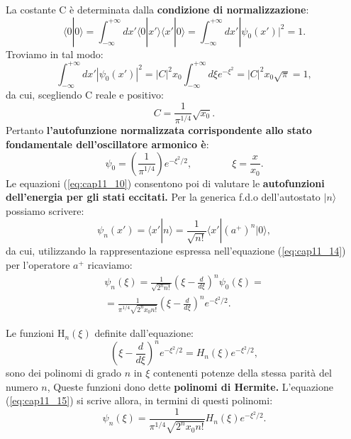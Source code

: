 \documentclass[a4paper,12pt,oneside]{book}
\begin{document}
La costante C è determinata dalla \textbf{condizione di normalizzazione}:
\begin{equation}
\langle 0|0 \rangle=\int_{-\infty}^{+\infty} dx' \langle 0|x'\rangle\langle x'|0 \rangle=\int_{-\infty}^{+\infty} dx' |\psi_0(x')|^2=1.
\end{equation}
Troviamo in tal modo:
\begin{equation}
\int_{-\infty}^{+\infty} dx' |\psi_0(x')|^2=|C|^2x_0\int_{-\infty}^{+\infty} d\xi e^{-\xi^2}=|C|^2 x_0 \sqrt{\pi}=1,
\end{equation}
da cui, scegliendo C reale e positivo:
\begin{equation}
C=\frac{1}{\pi^{{1}/{4}}} \sqrt{x_0}.
\end{equation}
Pertanto \textbf{l'autofunzione normalizzata corrispondente allo stato fondamentale dell'oscillatore armonico è}:
\begin{equation}
\psi_0=\left( \frac{1}{\pi^{{1}/{4}}}  \right) e^{-\xi^2/2}, \qquad \qquad \xi=\frac{x}{x_0}.
\end{equation}
 Le equazioni (\ref{eq:cap11_10}) consentono poi di valutare le \textbf{autofunzioni dell'energia per gli stati eccitati.} Per la generica f.d.o dell'autostato $|n\rangle$ possiamo scrivere:
\begin{equation}
\psi_n(x')=\langle x'|n \rangle=\frac{1}{\sqrt{n!}}\langle x'|(a^+)^n|0 \rangle,
\end{equation}
da cui, utilizzando la rappresentazione espressa nell'equazione (\ref{eq:cap11_14}) per l'operatore $a^+$ ricaviamo:
\begin{equation} \label{eq:cap11_15}
\begin{split}
	\psi_n(\xi)=\frac{1}{\sqrt{2^nn!}}(\xi-\frac{d}{d\xi})^n \psi_0({\xi})=\\
	=\frac{1}{\pi^{1/4}\sqrt{2^nx_0n!}}(\xi-\frac{d}{d\xi})^n e^{-\xi^2/2}.
\end{split} \end{equation}

 Le funzioni H$_n({\xi})$ definite dall'equazione:
\begin{equation}
(\xi-\frac{d}{d\xi})^n e^{-\xi^2/2}=H_n(\xi)e^{-\xi^2/2},
\end{equation}
sono dei polinomi di grado $n$ in $\xi$ contenenti potenze della stessa parità del numero $n$, Queste funzioni dono dette \textbf{polinomi di Hermite.} L'equazione (\ref{eq:cap11_15}) si scrive allora, in termini di questi polinomi:
\begin{equation}
\psi_n(\xi)=\frac{1}{\pi^{1/4}\sqrt{2^nx_0n!}} H_n(\xi)e^{-\xi^2/2}.
\end{equation}
\end{document}

